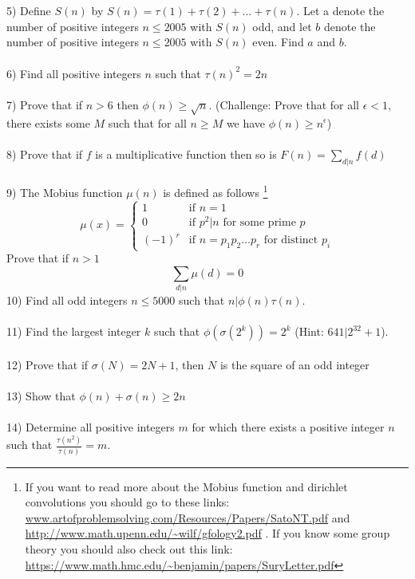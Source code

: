 \documentclass{article}
\begin{document}
\\
\\
5) Define $S(n)$ by $S(n)=\tau(1)+ \tau(2) + \ldots + \tau(n)$. Let a denote the number of positive integers $n \leq 2005$ with $S(n)$ odd, and let $b$ denote the number of positive integers $n \leq 2005$ with $S(n)$ even. Find $a$ and $b$.
\\
\\
6) Find all positive integers $n$ such that $\tau(n)^2=2n$ 
\\
\\
7) Prove that if $n>6$ then $\phi(n)\ge\sqrt{n}$. (Challenge: Prove that for all $\epsilon < 1$, there exists some $M$ such that for all $n\ge M$ we have $\phi(n)\ge n^{\epsilon}$)
\\
\\
8) Prove that if $f$ is a multiplicative function then so is $F(n)=\displaystyle\sum_{d|n} f(d)$
\\
\\
9) The M$\ddot{\text{o}}$bius function $\mu(n)$ is defined as follows \footnote{If you want to read more about the M$\ddot{\text{o}}$bius function and dirichlet convolutions you should go to these links: \url{www.artofproblemsolving.com/Resources/Papers/SatoNT.pdf} and \url{http://www.math.upenn.edu/~wilf/gfology2.pdf} . If you know some group theory you should also check out this link: \url{https://www.math.hmc.edu/~benjamin/papers/SuryLetter.pdf}}
\[
 \mu(x) =
  \begin{cases}
   1 & \text{if } n=1 \\
   0       & \text{if } p^2|n \text{ for some prime } p \\
   (-1)^r  & \text{if } n=p_1p_2\ldots p_r \text{ for distinct } p_i
  \end{cases}
\]
Prove that if $n>1$
\begin{equation*}
\displaystyle\sum_{d|n} \mu(d) = 0
\end{equation*}
10) Find all odd integers $n\le 5000$ such that $n|\phi(n)\tau(n)$.
\\
\\
11) Find the largest integer $k$ such that $\phi(\sigma(2^k))=2^k$ (Hint: $641|2^{32}+1$).
\\
\\
12) Prove that if $\sigma(N)=2N+1$, then $N$ is the square of an odd integer 
\\
\\
13) Show that $\phi(n)+\sigma(n)\ge 2n$
\\
\\
14) Determine all positive integers $m$ for which there exists a positive integer $n$ such that $\displaystyle\frac{\tau(n^2)}{\tau(n)}=m$.
\end{document}
